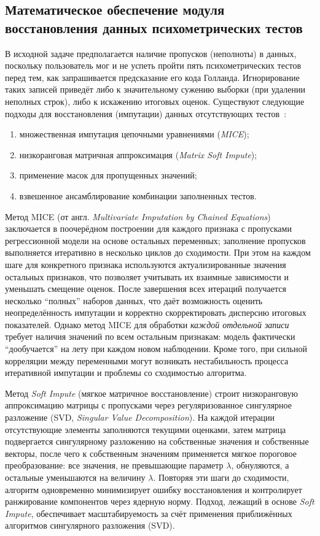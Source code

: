\subsection{Математическое обеспечение модуля восстановления данных психометрических тестов}
\label{subsec:imput}

В исходной задаче предполагается наличие пропусков (неполноты) в данных, поскольку пользователь мог и не успеть пройти пять психометрических тестов перед тем, как запрашивается предсказание его кода Голланда. Игнорирование таких записей приведёт либо к значительному сужению выборки (при удалении неполных строк), либо к искажению итоговых оценок. Существуют следующие подходы для восстановления (импутации) данных отсутствующих тестов~\cite{Buuren}:

\begin{enumerate}[label={\arabic*)}]
    \item множественная импутация цепочными уравнениями (\emph{MICE});
    \item низкоранговая матричная аппроксимация (\emph{Matrix Soft Impute});
    \item применение масок для пропущенных значений;
    \item взвешенное ансамблирование комбинации заполненных тестов.
\end{enumerate}

Метод MICE (от англ. \emph{Multivariate Imputation by Chained Equations}) заключается в поочерёдном построении для каждого признака с пропусками регрессионной модели на основе остальных переменных; заполнение пропусков выполняется итеративно в несколько циклов до сходимости. При этом на каждом шаге для конкретного признака используются актуализированные значения остальных признаков, что позволяет учитывать их взаимные зависимости и уменьшать смещение оценок. После завершения всех итераций получается несколько \enquote{полных} наборов данных, что даёт возможность оценить неопределённость импутации и корректно скорректировать дисперсию итоговых показателей. Однако метод MICE для обработки \textit{каждой отдельной записи} требует наличия значений по всем остальным признакам: модель фактически \enquote{дообучается} на лету при каждом новом наблюдении. Кроме того, при сильной корреляции между переменными могут возникать нестабильность процесса итеративной импутации и проблемы со сходимостью алгоритма.

Метод \emph{Soft Impute} (мягкое матричное восстановление) строит низкоранговую аппроксимацию матрицы с пропусками через регуляризованное сингулярное разложение (SVD, \emph{Singular Value Decomposition}). На каждой итерации отсутствующие элементы заполняются текущими оценками, затем матрица подвергается сингулярному разложению на собственные значения и собственные векторы, после чего к собственным значениям применяется мягкое пороговое преобразование: все значения, не превышающие параметр $\lambda$, обнуляются, а остальные уменьшаются на величину $\lambda$. Повторяя эти шаги до сходимости, алгоритм одновременно минимизирует ошибку восстановления и контролирует ранжирование компонентов через ядерную норму. Подход, лежащий в основе \emph{Soft Impute}, обеспечивает масштабируемость за счёт применения приближённых алгоритмов сингулярного разложения (SVD).

